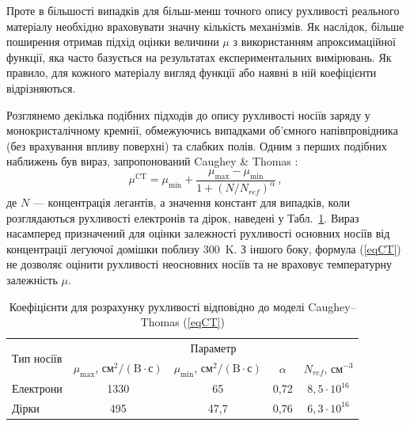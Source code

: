 \documentclass[12pt,a4paper,titlepage,oneside]{book}
\numberwithin{equation}{part}
\begin{document}
Проте в більшості випадків для більш-менш точного опису рухливості реального матеріалу необхідно враховувати значну кількість механізмів.
Як наслідок, більше поширення отримав підхід оцінки величини $\mu$ з використанням апроксимаційної функції, яка часто базується на результатах експериментальних вимірювань.
Як правило, для кожного матеріалу вигляд функції або наявні в ній коефіцієнти відрізняються.

Розглянемо декілька подібних підходів до опису рухливості носіїв заряду у монокристалічному кремнії, обмежуючись випадками об'ємного напівпровідника
(без врахування впливу поверхні) та слабких полів.
Одним з перших подібних наближень був вираз, запропонований   Caughey \& Thomas \cite{Caughey1967}:
\begin{equation}\label{eqCT}
  \mu^\mathrm{CT}=\mu_\mathrm{min}+\frac{\mu_\mathrm{max}-\mu_\mathrm{min}}{1+(N/N_{ref})^\alpha}\,,
\end{equation}
де
$N$ --- концентрація легантів,
а значення констант для випадків, коли розглядаються рухливості електронів та дірок, наведені у Табл.~\ref{tblCT}.
Вираз насамперед призначений для оцінки залежності рухливості основних носіїв від концентрації легуючої домішки поблизу 300~K.
З іншого боку, формула (\ref{eqCT}) не дозволяє оцінити рухливості неосновних носіїв та не враховує температурну залежність $\mu$.


\begin{table}
\caption{Коефіцієнти для розрахунку рухливості відповідно до моделі Caughey--Thomas (\ref{eqCT})}
\label{tblCT}
\centering
\begin{tabular}{|l|c|c|c|c|}
\hline
\multirow{2}{*}{Тип носіїв} & \multicolumn{4}{c|}{Параметр} \\
\cline{2-5}
&$\mu_\mathrm{max}$, $\text{см}^2/(\text{B}\cdot\text{с})$&$\mu_\mathrm{min}$, $\text{см}^2/(\text{B}\cdot\text{с})$&$\alpha$&$N_{ref}$, см$^{-3}$ \rule{0pt}{13pt}\\
\hline
Електрони&1330&65&0,72&$8,5\cdot10^{16}$\\
\hline
Дірки&495&47,7&0,76&$6,3\cdot10^{16}$\\
\hline
\end{tabular}
\end{table}
\end{document}
